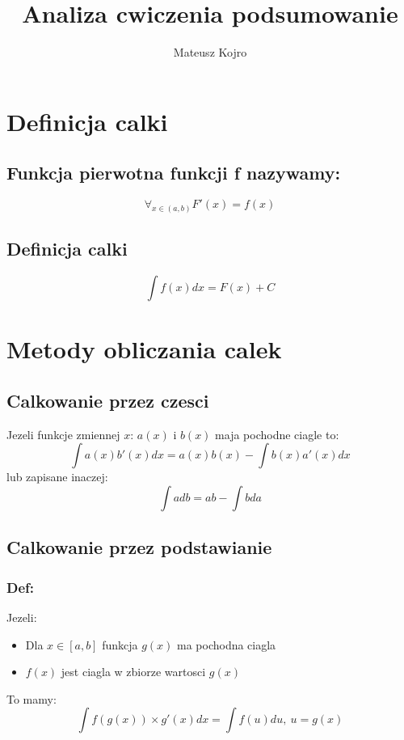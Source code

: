 \documentclass[]{article}
\title{Analiza cwiczenia podsumowanie}
\author{Mateusz Kojro}
\begin{document}
\maketitle
\section{Definicja calki}
\subsection{Funkcja pierwotna funkcji f nazywamy:}
\begin{equation}
  \forall_{x \in (a,b)} F'(x) = f(x)
\end{equation}
\subsection{Definicja calki}
\begin{equation}
  \int f(x)dx = F(x) + C
\end{equation}
\section{Metody obliczania calek}
\subsection{Calkowanie przez czesci}
Jezeli funkcje zmiennej $x$: $a(x)$ i $b(x)$ maja pochodne ciagle to:
\begin{equation}
  \int{a(x) b'(x) dx} = a(x)b(x) - \int{b(x)a'(x)dx}
\end{equation}
lub zapisane inaczej:
\begin{equation}
  \int{adb} = ab - \int{bda}
\end{equation}
\subsection{Calkowanie przez podstawianie}
\label{subsec:podstawianie}
\subsubsection{Def:}
Jezeli:
\begin{itemize}
\item Dla $x \in [a,b]$ funkcja $g(x)$ ma pochodna ciagla
\item $f(x)$ jest ciagla w zbiorze wartosci $g(x)$
\end{itemize}
To mamy:
\begin{equation}
  \int{f(g(x)) \times g'(x)dx} = \int{f(u)du}, \ u = g(x)
\end{equation}
\end{document}
